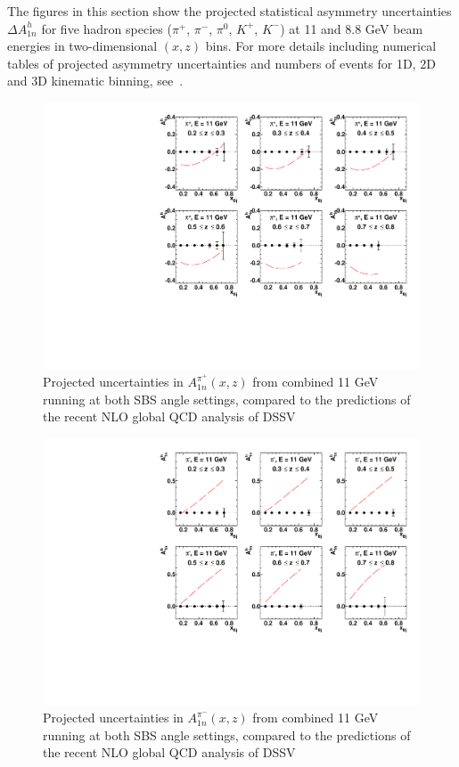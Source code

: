 The figures in this section show the projected statistical asymmetry uncertainties $\Delta A_{1n}^h$ for five hadron species ($\pi^+$, $\pi^-$, $\pi^0$, $K^+$, $K^-$) at 11 and 8.8 GeV beam energies in two-dimensional $(x,z)$ bins. For more details including numerical tables of projected asymmetry uncertainties and numbers of events for 1D, 2D and 3D kinematic binning, see~\cite{Projections_link}.   

\begin{figure}[h]
  \begin{center}
    \includegraphics[width=.75\textwidth]{figures/A1n_vs_x_E11_pip.pdf}
  \end{center}
  \caption{\label{A1n_pip_11gev} Projected uncertainties in $A_{1n}^{\pi^+}(x,z)$ from combined 11 GeV running at both SBS angle settings, compared to the predictions of the recent NLO global QCD analysis of DSSV~\cite{DSSVplus}}
\end{figure}

\begin{figure}[h]
  \begin{center}
    \includegraphics[width=.75\textwidth]{figures/A1n_vs_x_E11_pim.pdf}
  \end{center}
  \caption{\label{A1n_pim_11gev} Projected uncertainties in $A_{1n}^{\pi^-}(x,z)$ from combined 11 GeV running at both SBS angle settings, compared to the predictions of the recent NLO global QCD analysis of DSSV~\cite{DSSVplus}}
\end{figure}


